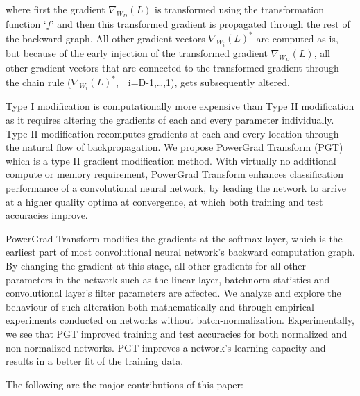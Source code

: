 \documentclass[times,sort&compress]{elsarticle}
\begin{document}
where first the gradient $\nabla_{W_D}(L)$ is transformed using the transformation
function `$f$' and then this transformed gradient is propagated through the rest of the
backward graph. All other gradient vectors $\nabla_{W_i}(L)^{*}$ are computed as is, but
because of the early injection of the transformed gradient $\nabla_{W_D}(L)$, all other
gradient vectors that are connected to the transformed gradient through the chain rule
($\nabla_{W_i}(L)^{*}$,\ \ i=D-1,\ldots,1), gets subsequently altered.

Type I modification is computationally more expensive than Type II modification as it
requires altering the gradients of each and every parameter individually. Type II
modification recomputes gradients at each and every location through the natural flow of
backpropagation. We propose PowerGrad Transform (PGT) which is a type II gradient
modification method. With virtually no additional compute or memory requirement,
PowerGrad Transform enhances classification performance of a convolutional neural
network, by leading the network to arrive at a higher quality optima at convergence, at
which both training and test accuracies improve.


PowerGrad Transform modifies the gradients at the softmax layer, which is the earliest
part of most convolutional neural network's backward computation graph. By changing the
gradient at this stage, all other gradients for all other parameters in the network such
as the linear layer, batchnorm statistics and convolutional layer's filter parameters
are affected. We analyze and explore the behaviour of such alteration both
mathematically and through empirical experiments conducted on networks without
batch-normalization. Experimentally, we see that PGT improved training and test
accuracies for both normalized and non-normalized networks. PGT improves a network's
learning capacity and results in a better fit of the training data.



The following are the major contributions of this paper:
\end{document}
